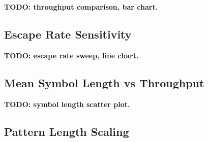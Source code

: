 \documentclass[sigconf,nonacm]{acmart}
\begin{document}
\textbf{TODO: throughput comparison, bar chart.}


\subsection{Escape Rate Sensitivity}
\label{sec:eval-escape}

%

\textbf{TODO: escape rate sweep, line chart.}


\subsection{Mean Symbol Length vs Throughput}
\label{sec:eval-symlen}

%

\textbf{TODO: symbol length scatter plot.}


\subsection{Pattern Length Scaling}
\label{sec:eval-patlen}

%
\end{document}
